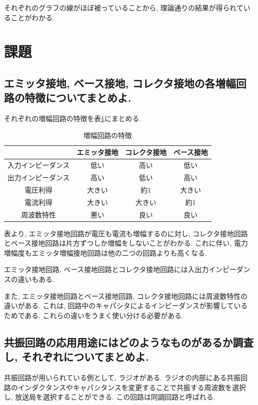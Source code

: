 \documentclass[titlepage]{jsarticle}
\begin{document}
                それぞれのグラフの線がほぼ被っていることから, 理論通りの結果が得られていることがわかる.

\section{課題}
    \subsection{エミッタ接地, ベース接地, コレクタ接地の各増幅回路の特徴についてまとめよ.}
        それぞれの増幅回路の特徴を表\ref{tab:feature}にまとめる.

        \begin{table}[h]
            \caption{増幅回路の特徴}
            \label{tab:feature}
            \centering
            \begin{tabular}{c||ccc} \hline
                & エミッタ接地 & コレクタ接地 & ベース接地 \\ \hline
                入力インピーダンス & 低い & 高い & 低い \\
                出力インピーダンス & 高い & 低い & 高い \\
                電圧利得 & 大きい & 約1 & 大きい \\
                電流利得 & 大きい & 大きい & 約1 \\
                周波数特性 & 悪い & 良い & 良い \\ \hline
            \end{tabular}
        \end{table}

        表より, エミッタ接地回路が電圧も電流も増幅するのに対し,
        コレクタ接地回路とベース接地回路は片方ずつしか増幅をしないことがわかる.
        これに伴い, 電力増幅度もエミッタ増幅接地回路は他の二つの回路よりも高くなる.

        エミッタ接地回路, ベース接地回路とコレクタ接地回路には入出力インピーダンスの違いもある.

        また, エミッタ接地回路とベース接地回路, コレクタ接地回路には周波数特性の違いがある.
        これは, 回路中のキャパシタによるインピーダンスが影響しているためである.
        これらの違いをうまく使い分ける必要がある.

    \subsection{共振回路の応用用途にはどのようなものがあるか調査し, それぞれについてまとめよ.}
        共振回路が用いられている例として, ラジオがある.
        ラジオの内部にある共振回路のインダクタンスやキャパシタンスを変更することで共振する周波数を選択し,
        放送局を選択することができる. この回路は同調回路と呼ばれる.
\end{document}
